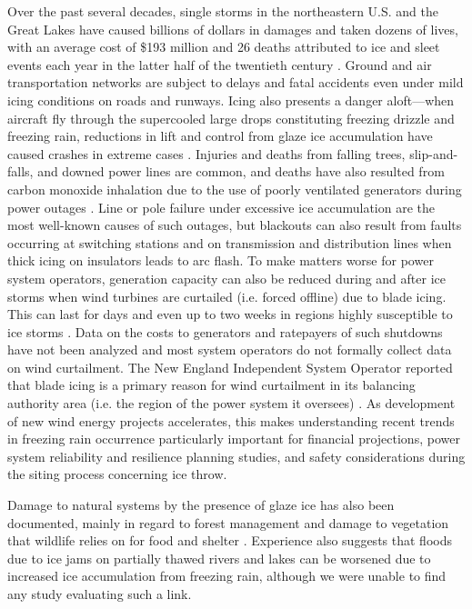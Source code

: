 \documentclass[twocol]{ametsoc}
\begin{document}
Over the past several decades, single storms in the northeastern U.S. and the Great Lakes have caused billions of dollars in damages and taken dozens of lives, with an average cost of \$193 million and 26 deaths attributed to ice and sleet events each year in the latter half of the twentieth century \citep{lott2006tracking, changnon2006severe, ncei2019storm}. Ground and air transportation networks are subject to delays and fatal accidents even under mild icing conditions on roads and runways. Icing also presents a danger aloft---when aircraft fly through the supercooled large drops constituting freezing drizzle and freezing rain, reductions in lift and control from glaze ice accumulation have caused crashes in extreme cases \citep{bernstein2000freezing}. Injuries and deaths from falling trees, slip-and-falls, and downed power lines are common, and deaths have also resulted from carbon monoxide inhalation due to the use of poorly ventilated generators during power outages \citep{daley2000outbreak}. Line or pole failure under excessive ice accumulation are the most well-known causes of such outages, but blackouts can also result from faults occurring at switching stations and on transmission and distribution lines when thick icing on insulators leads to arc flash. To make matters worse for power system operators, generation capacity can also be reduced during and after ice storms when wind turbines are curtailed (i.e. forced offline) due to blade icing. This can last for days and even up to two weeks in regions highly susceptible to ice storms \citep{davis2014forecast}. Data on the costs to generators and ratepayers of such shutdowns have not been analyzed and most system operators do not formally collect data on wind curtailment. The New England Independent System Operator reported that blade icing is a primary reason for wind curtailment in its balancing authority area (i.e. the region of the power system it oversees) \citep{bird2014wind}. As development of new wind energy projects accelerates, this makes understanding recent trends in freezing rain occurrence particularly important for financial projections, power system reliability and resilience planning studies, and safety considerations during the siting process concerning ice throw. 

Damage to natural systems by the presence of glaze ice has also been documented, mainly in regard to forest management and damage to vegetation that wildlife relies on for food and shelter \citep{pellikka2000modelling,proulx2001relationship}. Experience also suggests that floods due to ice jams on partially thawed rivers and lakes can be worsened due to increased ice accumulation from freezing rain, although we were unable to find any study evaluating such a link. 
\end{document}
